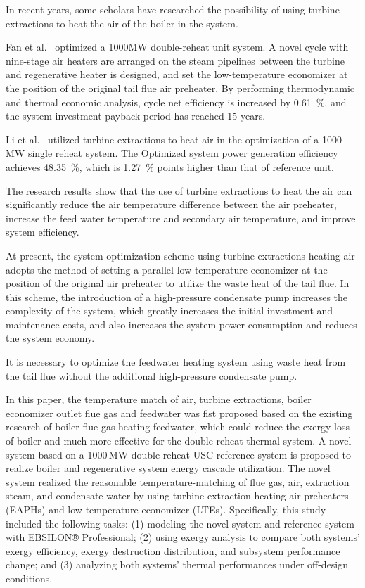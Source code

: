 \documentclass[preprint,12pt]{elsarticle}
\begin{document}
In recent years, some scholars have researched the possibility of using turbine extractions to heat the air of the boiler in the system.

Fan et al.~\cite{Fan2018}  optimized a 1000MW double-reheat unit system. 
A novel cycle with nine-stage air heaters are arranged on the steam pipelines between the turbine and regenerative heater is designed, and set the low-temperature economizer at the position of the original tail flue air preheater.
By performing thermodynamic and thermal economic analysis, cycle net efficiency is increased by 0.61~\%, and the system investment payback period has reached 15 years.

Li et al.~\cite{Liu2018} utilized turbine extractions to heat air in the optimization of a 1000 MW single reheat system. 
The Optimized system power generation efficiency achieves 48.35~\%, which is 1.27~\% points higher than that of reference unit.

The research results show that the use of turbine extractions to heat the air can significantly reduce the air temperature difference between the air preheater, increase the feed water temperature and secondary air temperature, and improve system efficiency.

At present, the system optimization scheme using turbine extractions heating air adopts the method of setting a  parallel low-temperature economizer at the position of the original air preheater to utilize the waste heat of the tail flue.
In this scheme, the introduction of a high-pressure condensate pump increases the complexity of the system, which greatly increases the initial investment and maintenance costs, and also increases the system power consumption and reduces the system economy.

It is necessary to optimize the feedwater heating system using waste heat from the tail flue without the additional high-pressure condensate pump.



In this paper, the temperature match of air, turbine extractions, boiler economizer outlet flue gas and feedwater was fist proposed based on the existing research of boiler flue gas heating feedwater, which could reduce the exergy loss of boiler and much more effective for the double reheat thermal system.
A novel system based on a 1000\,MW double-reheat USC reference system is proposed to realize boiler and regenerative system energy cascade utilization. 
The novel system realized the reasonable temperature-matching of flue gas, air, extraction steam, and condensate water by using turbine-extraction-heating air preheaters (EAPHs) and low temperature economizer (LTEs).
Specifically, this study included the following tasks: (1) modeling the novel system and reference system with EBSILON® Professional; (2) using exergy analysis to compare both systems' exergy efficiency, exergy destruction distribution, and subsystem performance change; and (3) analyzing both systems' thermal performances under off-design conditions.
\end{document}
